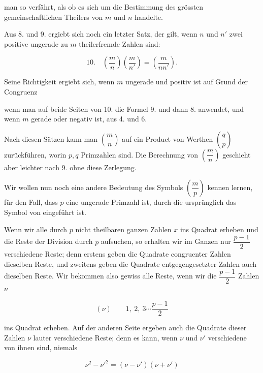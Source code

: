 man so verfährt, als ob es sich um die Bestimmung des grössten
gemeinschaftlichen Theilers von $m$ und $n$ handelte.

Aus 8. und 9. ergiebt sich noch ein letzter Satz, der gilt, wenn
$n$ und $n'$ zwei positive ungerade zu $m$ theilerfremde Zahlen sind:

\[
10.\quad \left(\frac{m}{n}\right)\left(\frac{m}{n'}\right) = \left(\frac{m}{nn'}\right).
\]

Seine Richtigkeit ergiebt sich, wenn $m$ ungerade und positiv
ist auf Grund der Congruenz


wenn man auf beide Seiten von 10. die Formel 9. und dann 8.
anwendet, und wenn $m$ gerade oder negativ ist, aus 4. und 6.

Nach diesen Sätzen kann man $\left(\dfrac{m}{n}\right)$ auf ein Product von
Werthen $\left(\dfrac{q}{p}\right)$ zurückführen, worin $p, q$ Primzahlen sind. Die
Berechnung von $\left(\dfrac{m}{n}\right)$ geschieht aber leichter nach 9. ohne diese
Zerlegung.

Wir wollen nun noch eine andere Bedeutung des Symbols
$\left(\dfrac{m}{p}\right)$ kennen lernen, für den Fall, dass $p$ eine ungerade Primzahl
 ist, durch die ursprünglich das Symbol von  eingeführt
 ist.

Wenn wir alle durch $p$ nicht theilbaren ganzen Zahlen $x$
ins Quadrat erheben und die Reste der Division durch $p$ aufsuchen,
so erhalten wir im Ganzen nur $\dfrac{p-1}{2}$ verschiedene
Reste; denn erstens geben die Quadrate congruenter Zahlen dieselben
 Reste, und zweitens geben die Quadrate entgegengesetzter
Zahlen auch dieselben Reste. Wir bekommen also gewiss alle
Reste, wenn wir die $\dfrac{p-1}{2}$ Zahlen $\nu$

\[
(\nu)\qquad 1,\ 2,\ 3\cdots\frac{p-1}{2}
\]

ins Quadrat erheben. Auf der anderen Seite ergeben auch die
Quadrate dieser Zahlen $\nu$ lauter verschiedene Reste; denn es
kann, wenn $\nu$ und $\nu'$ verschiedene von ihnen sind, niemals

\[
\nu^2 - \nu'^2 = (\nu - \nu')(\nu + \nu')
\]
